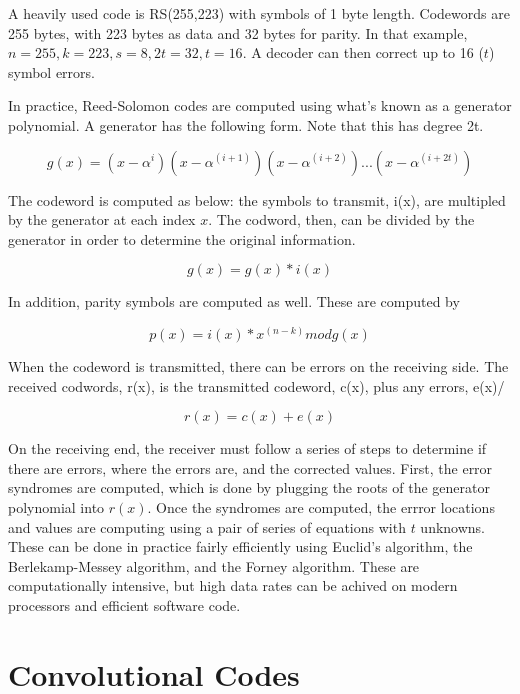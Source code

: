 \documentclass[12pt]{article}
\begin{document}
A heavily used code is RS(255,223) with symbols of 1 byte length. Codewords are 255 bytes, with 223 bytes as data and 32 bytes for parity. In that example, $n= 255, k = 223, s = 8, 2t = 32, t = 16$. A decoder can then correct up to 16 ($t$) symbol errors. 

In practice, Reed-Solomon codes are computed using what's known as a generator polynomial. A generator has the following form. Note that this has degree 2t. 

\begin{equation}
g(x) = (x-\alpha^i)(x-\alpha^(i+1))(x-\alpha^(i+2)) ... (x-\alpha^(i+2t))
\end{equation}

The codeword is computed as below: the symbols to transmit, i(x), are multipled by the generator at each index $x$. The codword, then, can be divided by the generator in order to determine the original information.

\begin{equation}
g(x) = g(x) * i(x)
\end{equation}

In addition, parity symbols are computed as well. These are computed by 

\begin{equation}
p(x) = i(x) * x^(n-k)  mod g(x)
\end{equation}

When the codeword is transmitted, there can be errors on the receiving side. The received codwords, r(x), is the transmitted codeword, c(x), plus any errors, e(x)/

\begin{equation}
r(x) = c(x) + e(x)
\end{equation}

On the receiving end, the receiver must follow a series of steps to determine if there are errors, where the errors are, and the corrected values. First, the error syndromes are computed, which is done by plugging the roots of the generator polynomial into $r(x)$. Once the syndromes are computed, the errror locations and values are computing using a pair of series of equations with $t$ unknowns. These can be done in practice fairly efficiently using Euclid's algorithm, the Berlekamp-Messey algorithm, and the Forney algorithm. These are computationally intensive, but high data rates can be achived on modern processors and efficient software code. \cite{rsg}

\section{Convolutional Codes}
\end{document}
